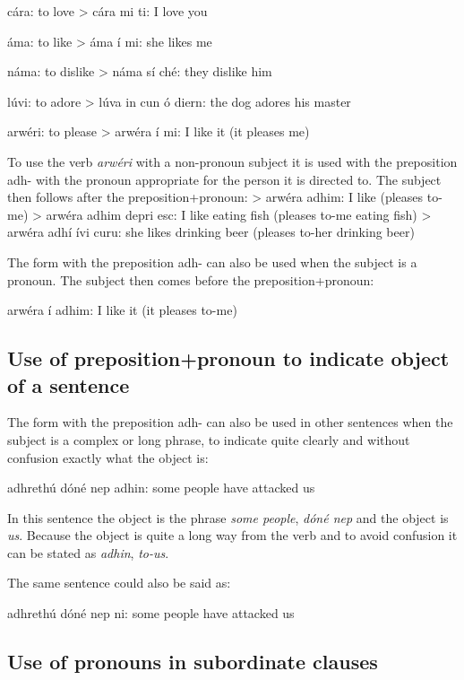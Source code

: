 c\'{a}ra: to love
> c\'{a}ra mi ti: I love you

\'{a}ma: to like
> \'{a}ma \'{i} mi: she likes me

n\'{a}ma: to dislike
> n\'{a}ma s\'{i} ch\'{e}: they dislike him

l\'{u}vi: to adore
> l\'{u}va in cun \'{o} diern: the dog adores his master

arw\'{e}ri: to please
> arw\'{e}ra \'{i} mi: I like it (it pleases me)

To use the verb \textit{arw\'{e}ri} with a non-pronoun subject it is used with the preposition adh- with the pronoun appropriate for the person it is directed to. The subject then follows after the preposition+pronoun:
> arw\'{e}ra adhim: I like (pleases to-me)
> arw\'{e}ra adhim depri esc: I like eating fish (pleases to-me eating fish)
> arw\'{e}ra adh\'{i} \'{i}vi curu: she likes drinking beer (pleases to-her drinking beer)

The form with the preposition adh- can also be used when the subject is a pronoun. The subject then comes before the preposition+pronoun:

arw\'{e}ra \'{i} adhim: I like it (it pleases to-me)

\subsection{Use of preposition+pronoun to indicate object of a sentence}

The form with the preposition adh- can also be used in other sentences when the subject is a complex or long phrase, to indicate quite clearly and without confusion exactly what the object is:

adhreth\'{u} d\'{o}n\'{e} nep adhin: some people have attacked us

In this sentence the object is the phrase \textit{some people}, \textit{d\'{o}n\'{e} nep} and the object is \textit{us}. Because the object is quite a long way from the verb and to avoid confusion it can be stated as \textit{adhin}, \textit{to-us}.

The same sentence could also be said as:

adhreth\'{u} d\'{o}n\'{e} nep ni: some people have attacked us

\subsection{Use of pronouns in subordinate clauses}

